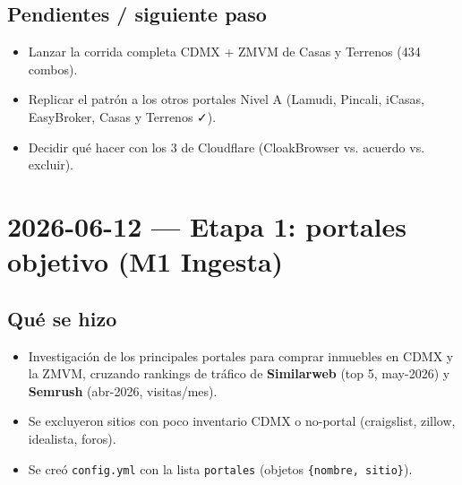 \documentclass[11pt]{article}
\newcommand{\codigo}[1]{\texttt{#1}}
\newcommand{\pend}{\item[\textcolor{acento}{$\square$}]}
\begin{document}
\subsection*{Pendientes / siguiente paso}
\begin{itemize}
  \pend Lanzar la corrida completa CDMX + ZMVM de Casas y Terrenos (434 combos).
  \pend Replicar el patrón a los otros portales Nivel A (Lamudi, Pincali, iCasas,
        EasyBroker, Casas y Terrenos ✓).
  \pend Decidir qué hacer con los 3 de Cloudflare (CloakBrowser vs. acuerdo vs. excluir).
\end{itemize}

\section*{2026-06-12 — Etapa 1: portales objetivo (M1 Ingesta)}

\subsection*{Qué se hizo}
\begin{itemize}
  \item Investigación de los principales portales para comprar inmuebles en CDMX
        y la ZMVM, cruzando rankings de tráfico de \textbf{Similarweb} (top 5,
        may-2026) y \textbf{Semrush} (abr-2026, visitas/mes).
  \item Se excluyeron sitios con poco inventario CDMX o no-portal
        (craigslist, zillow, idealista, foros).
  \item Se creó \codigo{config.yml} con la lista \codigo{portales} (objetos
        \codigo{\{nombre, sitio\}}).
\end{itemize}
\end{document}
